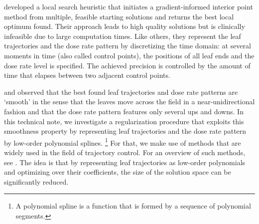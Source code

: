 \cite{balvertcraft} developed a local search heuristic that initiates a gradient-informed interior point method from multiple, feasible starting solutions and returns the best local optimum found.
Their approach leads to high quality solutions but is clinically infeasible due to large computation times.
Like others, they represent the leaf trajectories and the dose rate pattern by discretizing the time domain:
at several moments in time (also called control points), the positions of all leaf ends and the dose rate level is specified.
The achieved precision is controlled by the amount of time that elapses between two adjacent control points.

\cite{balvertcraft} and \cite{thesisKvA} %
observed that the best found leaf trajectories and dose rate patterns are `smooth' in the sense that the leaves move across the field in a near-unidirectional fashion and that the dose rate pattern features only several ups and downs. %
In this technical note, we investigate a regularization procedure that exploits this smoothness property by representing leaf trajectories and the dose rate pattern by low-order polynomial splines.
\footnote{A polynomial spline is a function that is formed by a sequence of polynomial segments.}
For that, we make use of methods that are widely used in the field of trajectory control.
For an overview of such methods, see .
The idea is that by representing leaf trajectories as low-order polynomials and optimizing over their coefficients, the size of the solution space can be significantly reduced.




